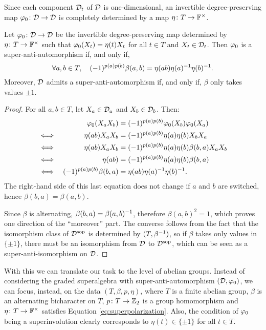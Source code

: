 Since each component $\mathcal{D}_t$ of $\mathcal{D}$ is one-dimensional, an invertible degree-preserving map $\varphi_0\colon \mathcal{D} \to \mathcal{D}$ is completely determined by a map $\eta\colon T \to \mathbb{F}^\times$.

\begin{prop}\label{prop:superpolarization}
    Let $\varphi_0\colon \mathcal{D} \to \mathcal{D}$ be the invertible degree-preserving map determined by $\eta\colon T \to \mathbb{F}^\times$  such that $\varphi_0(X_t) = \eta(t) X_t$ for all $t\in T$ and $X_t\in \mathcal{D}_t$. 
    Then $\varphi_0$ is a super-anti-automorphism if, and only if,
    \begin{equation}\label{eq:superpolarization}
        \forall a,b\in T, \quad (-1)^{p(a) p(b)} \beta(a,b) =  \eta(ab) \eta(a)^{-1} \eta(b)^{-1}.
    \end{equation}
    Moreover, $\mathcal{D}$ admits a super-anti-automorphism if, and only if, $\beta$ only takes values $\pm 1$.
\end{prop}

\begin{proof}
    For all $a,b \in T$, let $X_a \in \mathcal{D}_a$ and $X_b\in \mathcal{D}_b$. Then:
    \begin{alignat*}{2}
        &&\varphi_0(X_a X_b) &= (-1)^{p(a) p(b)} \varphi_0(X_b) \varphi_0(X_a)\\
        \iff&&\,\, \eta(ab)X_a X_b &= (-1)^{p(a) p(b)} \eta(a) \eta(b) X_b X_a\\
        \iff&&\, \eta(ab)X_a X_b &= (-1)^{p(a) p(b)} \eta(a) \eta(b) \beta(b,a) X_a X_b\\
        \iff&& \eta(ab) &= (-1)^{p(a) p(b)} \eta(a) \eta(b) \beta(b,a)
        \\
        \iff&& (-1)^{p(a) p(b)} \beta(b, a) &=  \eta(ab) \eta(a)^{-1} \eta(b)^{-1}.
    \end{alignat*}
    The right-hand side of this last equation does not change if $a$ and $b$ are switched, hence $\beta(b,a) = \beta(a,b)$. 
    
    Since $\beta$ is alternating, $\beta(b, a) = \beta (a, b)^{-1}$, therefore $\beta(a,b)^2 = 1$, which proves one direction of the ``moreover'' part.
    The converse follows from the fact that the isomorphism class of $\mathcal{D}^{\mathrm{sop}}$ is determined by $(T, \beta^{-1})$, so if $\beta$ takes only values in $\{ \pm 1 \}$, there must be an isomorphism from $\mathcal{D}$ to $\mathcal{D}^{\mathrm{sop}}$, which can be seen as a super-anti-isomorphism on $\mathcal{D}$.
\end{proof}

With this we can translate our task to the level of abelian groups. 
Instead of considering the graded superalgebra with super-anti-automorphism $(\mathcal{D}, \varphi_0)$, we can focus, instead, on the data $(T, \beta, p, \eta)$, where $T$ is a finite abelian group, $\beta$ is an alternating bicharacter on $T$, $p\colon T \to \mathbb{Z}_2$ is a group homomorphism and $\eta\colon T \to \mathbb{F}^\times$ satisfies Equation \eqref{eq:superpolarization}. 
Also, the condition of $\varphi_0$ being a superinvolution clearly corresponds to $\eta(t) \in \{ \pm 1 \}$ for all $t\in T$.

